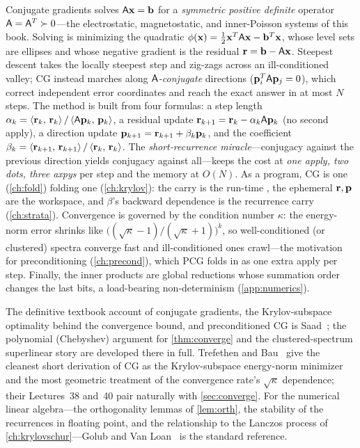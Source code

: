 \summarysection
Conjugate gradients solves $\mathsf{A}\mathbf{x}=\mathbf{b}$ for a \emph{symmetric positive
definite} operator $\mathsf{A}=\mathsf{A}^{T}\succ0$---the electrostatic, magnetostatic,
and inner-Poisson systems of this book. Solving is minimizing the quadratic
$\phi(\mathbf{x})=\tfrac12\mathbf{x}^{T}\mathsf{A}\mathbf{x}-\mathbf{b}^{T}\mathbf{x}$, whose level sets are ellipses
and whose negative gradient is the residual $\mathbf{r}=\mathbf{b}-\mathsf{A}\mathbf{x}$. Steepest
descent takes the locally steepest step and zig-zags across an ill-conditioned
valley; CG instead marches along \emph{$\mathsf{A}$-conjugate} directions
($\mathbf{p}_i^{T}\mathsf{A}\mathbf{p}_j=0$), which correct independent error coordinates and reach
the exact answer in at most $N$ steps. The method is built from four formulas: a
step length $\alpha_k=\left\langle \mathbf{r}_k,\, \mathbf{r}_k\right\rangle/\left\langle \mathsf{A}\mathbf{p}_k,\, \mathbf{p}_k\right\rangle$, a residual
update $\mathbf{r}_{k+1}=\mathbf{r}_k-\alpha_k\mathsf{A}\mathbf{p}_k$ (no second apply), a direction update
$\mathbf{p}_{k+1}=\mathbf{r}_{k+1}+\beta_k\mathbf{p}_k$, and the coefficient
$\beta_k=\left\langle \mathbf{r}_{k+1},\, \mathbf{r}_{k+1}\right\rangle/\left\langle \mathbf{r}_k,\, \mathbf{r}_k\right\rangle$. The
\emph{short-recurrence miracle}---conjugacy against the previous direction yields
conjugacy against all---keeps the cost at \emph{one apply, two dots, three axpys}
per step and the memory at $O(N)$. As a program, CG is one 
(\cref{ch:fold}) folding one  (\cref{ch:krylov}): the carry is
the run-time , the ephemeral $\mathbf{r},\mathbf{p}$ are the 
workspace, and $\beta$'s backward dependence is the recurrence carry
(\cref{ch:strata}). Convergence is governed by the condition number $\kappa$: the
energy-norm error shrinks like
$\big((\sqrt\kappa-1)/(\sqrt\kappa+1)\big)^k$, so well-conditioned (or clustered)
spectra converge fast and ill-conditioned ones crawl---the motivation for
preconditioning (\cref{ch:precond}), which PCG folds in as one extra apply per
step. Finally, the inner products are global reductions whose summation order
changes the last bits, a load-bearing non-determinism (\cref{app:numerics}).

\furtherreading
The definitive textbook account of conjugate gradients, the Krylov-subspace
optimality behind the convergence bound, and preconditioned CG is
Saad~\citep{saad2003}; the polynomial (Chebyshev) argument for
\cref{thm:converge} and the clustered-spectrum superlinear story are developed
there in full. Trefethen and Bau~\citep{trefethenbau1997} give the cleanest short
derivation of CG as the Krylov-subspace energy-norm minimizer and the most
geometric treatment of the convergence rate's $\sqrt\kappa$ dependence; their
Lectures~38 and~40 pair naturally with \cref{sec:converge}. For the numerical
linear algebra---the orthogonality lemmas of \cref{lem:orth}, the stability of the
recurrences in floating point, and the relationship to the Lanczos process of
\cref{ch:krylovschur}---Golub and Van Loan~\citep{golubvanloan2013} is the
standard reference.

